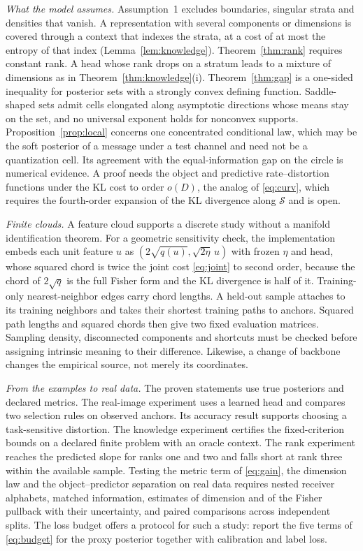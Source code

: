 \documentclass[10pt,journal]{IEEEtran}
\newcommand{\Sset}{\mathcal S}
\begin{document}
\emph{What the model assumes.} Assumption~1 excludes boundaries, singular strata and densities that vanish. A representation with several components or dimensions is covered through a context that indexes the strata, at a cost of at most the entropy of that index (Lemma~\ref{lem:knowledge}). Theorem~\ref{thm:rank} requires constant rank. A head whose rank drops on a stratum leads to a mixture of dimensions as in Theorem~\ref{thm:knowledge}(i). Theorem~\ref{thm:gap} is a one-sided inequality for posterior sets with a strongly convex defining function. Saddle-shaped sets admit cells elongated along asymptotic directions whose means stay on the set, and no universal exponent holds for nonconvex supports. Proposition~\ref{prop:local} concerns one concentrated conditional law, which may be the soft posterior of a message under a test channel and need not be a quantization cell. Its agreement with the equal-information gap on the circle is numerical evidence. A proof needs the object and predictive rate--distortion functions under the KL cost to order $o(D)$, the analog of \eqref{eq:curv}, which requires the fourth-order expansion of the KL divergence along $\Sset$ and is open.

\emph{Finite clouds.} A feature cloud supports a discrete study without a manifold identification theorem. For a geometric sensitivity check, the implementation embeds each unit feature $u$ as $(2\sqrt{q(u)},\sqrt{2\eta}\,u)$ with frozen $\eta$ and head, whose squared chord is twice the joint cost \eqref{eq:joint} to second order, because the chord of $2\sqrt q$ is the full Fisher form and the KL divergence is half of it. Training-only nearest-neighbor edges carry chord lengths. A held-out sample attaches to its training neighbors and takes their shortest training paths to anchors. Squared path lengths and squared chords then give two fixed evaluation matrices. Sampling density, disconnected components and shortcuts must be checked before assigning intrinsic meaning to their difference. Likewise, a change of backbone changes the empirical source, not merely its coordinates.

\emph{From the examples to real data.} The proven statements use true posteriors and declared metrics. The real-image experiment uses a learned head and compares two selection rules on observed anchors. Its accuracy result supports choosing a task-sensitive distortion. The knowledge experiment certifies the fixed-criterion bounds on a declared finite problem with an oracle context. The rank experiment reaches the predicted slope for ranks one and two and falls short at rank three within the available sample. Testing the metric term of \eqref{eq:gain}, the dimension law and the object--predictor separation on real data requires nested receiver alphabets, matched information, estimates of dimension and of the Fisher pullback with their uncertainty, and paired comparisons across independent splits. The loss budget offers a protocol for such a study: report the five terms of \eqref{eq:budget} for the proxy posterior together with calibration and label loss.
\end{document}
